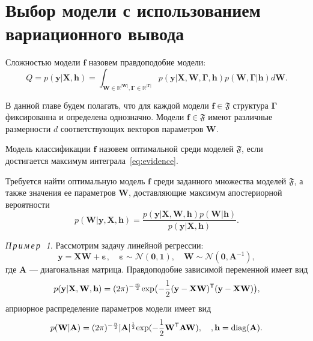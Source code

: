 \newpage{}
\chapter*{Выбор модели с использованием вариационного вывода}
\begin{defin}
Сложностью модели $\mathbf{f}$ назовем правдоподобие модели: 
\begin{equation}
\label{eq:evidence}
	Q = p(\mathbf{y}|\mathbf{X},\mathbf{h}) = \int_{\mathbf{W} \in \mathbb{R}^|\mathbf{W}|, \boldsymbol{\Gamma} \in \mathbb{R}^|\boldsymbol{\Gamma}|} p(\mathbf{y}|\mathbf{X},\mathbf{W},\boldsymbol{\Gamma}, \mathbf{h})p(\mathbf{W, \boldsymbol{\Gamma}}|\mathbf{h})d\mathbf{W}.
\end{equation}
\end{defin}

В данной главе будем полагать, что для каждой модели $\mathbf{f} \in \mathfrak{F}$ структура $\boldsymbol{\Gamma}$ фиксированна и определена однозначно.
Модели $\mathbf{f} \in \mathfrak{F}$ имеют различные размерности $d$ соответствующих векторов параметров $\mathbf{W}$.

Модель классификации $\mathbf{f}$ назовем оптимальной среди моделей $\mathfrak{F}$, если достигается максимум интеграла~\eqref{eq:evidence}.

Требуется найти оптимальную модель $\mathbf{f}$ среди заданного множества моделей $\mathfrak{F}$, а также значения ее параметров $\mathbf{W}$, доставляющие максимум апостериорной вероятности
\begin{equation}
\label{eq:posterior}
	p(\mathbf{W}|\mathbf{y},\mathbf{X},\mathbf{h}) = \frac{p(\mathbf{y}|\mathbf{X}, \mathbf{W}, \mathbf{h})p(\mathbf{W}|\mathbf{h})}{p(\mathbf{y}|\mathbf{X}, \mathbf{h})}.
\end{equation}


\textsl{П\,р\,и\,м\,е\,р~\,1.} Рассмотрим задачу линейной регрессии:
\[
	\mathbf{y} =\mathbf{X} \mathbf{W} + \boldsymbol{\varepsilon},\quad \boldsymbol{\varepsilon}  \sim \mathcal{N}(\mathbf{0},\mathbf{1}),\quad \mathbf{W} \sim  \mathcal{N}(\mathbf{0},\mathbf{A}^{-1}),
\]
где $\mathbf{A}$ --- диагональная матрица. 
Правдоподобие зависимой переменной имеет вид
\begin{equation}
\label{eq:example1}
	p(\mathbf{y}|  \mathbf{X}, \mathbf{W},\mathbf{h}) = (2\pi) ^{-\frac{m}{2}} \textnormal{exp} \bigl(-\frac{1}{2}(\mathbf{y} -\mathbf{X} \mathbf{W})^\mathsf{T}(\mathbf{y} - \mathbf{X}\mathbf{W})\bigr),
\end{equation}
априорное распределение параметров модели имеет вид
\begin{equation}
\label{eq:prior}	
p(\mathbf{W}|\mathbf{A}) =  (2\pi) ^{-\frac{n}{2}} |\mathbf{A}|^{\frac{1}{2}} \textnormal{exp} (-\frac{1}{2}\mathbf{W}^\mathsf{T}\mathbf{A}\mathbf{W}), \quad, \mathbf{h} = \text{diag}(\mathbf{A}).
\end{equation}

